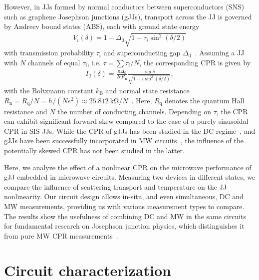 However, in JJs formed by normal conductors between superconductors (SNS) such as graphene Josephson junctions (gJJs), transport across the JJ is governed by Andreev bound states (ABS), each with ground state energy
\begin{align}
V_i(\delta)=1-\Delta_0\sqrt{1-\tau_i\sin^2(\delta/2)}
\label{CPReq:ABSenergy}
\end{align}
%
with transmission probability $\tau_i$ and superconducting gap $\Delta_0$~\cite{beenakkerUniversalLimitCriticalcurrent1991,titovJosephsonEffectBallistic2006b}.
%
Assuming a JJ with $N$ channels of equal $\tau_i$, i.e. $\tau=\sum\tau_i/N$, the corresponding CPR is given by
\begin{align}
I_\text{J}(\delta) = \frac{\pi\Delta_0}{2 e R_\text{n}} \frac{\sin\delta}{\sqrt{1 - \tau \sin^2(\delta / 2)}},
\label{CPReq:CPR-ball}
\end{align}
%
with the Boltzmann constant $k_\text{B}$ and normal state resistance $R_\text{n}= R_\text{q}/N = h/(Ne^2)\approx \SI{25.812}{\kilo\ohm} / N$~\cite{golubovCurrentphaseRelationJosephson2004a,leeUltimatelyShortBallistic2015}.
%
Here, $R_\text{q}$ denotes the quantum Hall resistance and $N$ the number of conducting channels.
%
Depending on $\tau$, the CPR can exhibit significant forward skew compared to the case of a purely sinusoidal CPR in SIS JJs.
%
While the CPR of gJJs has been studied in the DC regime~\cite{englishObservationNonsinusoidalCurrentphase2016,nandaCurrentPhaseRelationBallistic2017}, and gJJs have been successfully incorporated in MW circuits~\cite{schmidtBallisticGrapheneSuperconducting2018,krollMagneticFieldCompatible2018,wangCoherentControlHybrid2019}, the influence of the potentially skewed CPR has not been studied in the latter.

Here, we analyze the effect of a nonlinear CPR on the microwave performance of gJJ embedded in microwave circuits.
%
Measuring two devices in different states, we compare the influence of scattering transport and temperature on the JJ nonlinearity.
%
Our circuit design allows in-situ, and even simultaneous, DC and MW measurements, providing us with various measurement types to compare.
%
The results show the usefulness of combining DC and MW in the same circuits for fundamental research on Josephson junction physics, which distinguishes it from pure MW CPR measurements~\cite{rifkinCurrentphaseRelationPhasedependent1976}.

\section{Circuit characterization}

